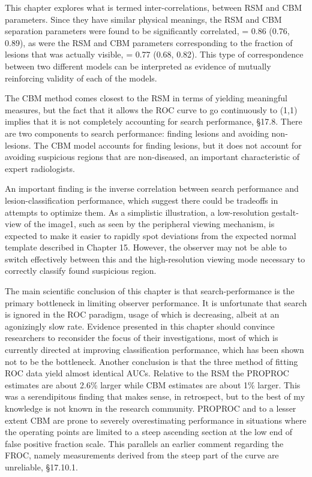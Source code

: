 \documentclass[
]{book}
\begin{document}
This chapter explores what is termed inter-correlations, between RSM and CBM parameters. Since they have similar physical meanings, the RSM and CBM separation parameters were found to be significantly correlated, = 0.86 (0.76, 0.89), as were the RSM and CBM parameters corresponding to the fraction of lesions that was actually visible, = 0.77 (0.68, 0.82). This type of correspondence between two different models can be interpreted as evidence of mutually reinforcing validity of each of the models.

The CBM method comes closest to the RSM in terms of yielding meaningful measures, but the fact that it allows the ROC curve to go continuously to (1,1) implies that it is not completely accounting for search performance, §17.8. There are two components to search performance: finding lesions and avoiding non-lesions. The CBM model accounts for finding lesions, but it does not account for avoiding suspicious regions that are non-diseased, an important characteristic of expert radiologists.

An important finding is the inverse correlation between search performance and lesion-classification performance, which suggest there could be tradeoffs in attempts to optimize them. As a simplistic illustration, a low-resolution gestalt-view of the image1, such as seen by the peripheral viewing mechanism, is expected to make it easier to rapidly spot deviations from the expected normal template described in Chapter 15. However, the observer may not be able to switch effectively between this and the high-resolution viewing mode necessary to correctly classify found suspicious region.

The main scientific conclusion of this chapter is that search-performance is the primary bottleneck in limiting observer performance. It is unfortunate that search is ignored in the ROC paradigm, usage of which is decreasing, albeit at an agonizingly slow rate. Evidence presented in this chapter should convince researchers to reconsider the focus of their investigations, most of which is currently directed at improving classification performance, which has been shown not to be the bottleneck. Another conclusion is that the three method of fitting ROC data yield almost identical AUCs. Relative to the RSM the PROPROC estimates are about 2.6\% larger while CBM estimates are about 1\% larger. This was a serendipitous finding that makes sense, in retrospect, but to the best of my knowledge is not known in the research community. PROPROC and to a lesser extent CBM are prone to severely overestimating performance in situations where the operating points are limited to a steep ascending section at the low end of false positive fraction scale. This parallels an earlier comment regarding the FROC, namely measurements derived from the steep part of the curve are unreliable, §17.10.1.
\end{document}
